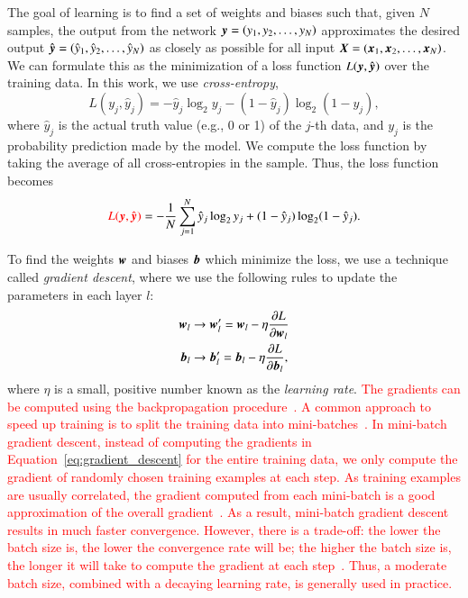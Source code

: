 \documentclass[fleqn,usenatbib]{mnras}
\newcommand{\eg}{{e.g., }}
\newcommand{\changed}[1]{\textcolor{red}{#1}}
\begin{document}
The goal of learning is to find a set of weights and biases such that,
given $N$ samples, the output from the network
$\bmath{y}=\left(y_1, y_2, \dots, y_N \right)$ approximates the desired output
$\hat{\bmath{y}}=\left(\hat{y}_1, \hat{y}_2, \dots, \hat{y}_N \right)$
as closely as possible for all input
$\bmath{X}=\left(\bmath{x}_1,\bmath{x}_2,\dots,\bmath{x}_N\right)$.
We can formulate this as the minimization of a loss function
$L(\bmath{y},\hat{\bmath{y}})$
over the training data.
In this work, we use \textit{cross-entropy},
\begin{equation}
  L(y_j, \hat{y}_j) = -\hat{y}_j \log_2 y_j - (1 - \hat{y}_j) \log_2(1 - y_j),
  \label{eq:cross_entropy}
\end{equation}
where $\hat{y}_j$ is the actual truth value (\eg 0 or 1) of the $j$-th data, and
$y_j$ is the probability prediction made by the model.
We compute the loss function by taking the average of all cross-entropies in the sample.
Thus, the loss function becomes
\begin{equation}
\changed{
  L(\bmath{y}, \hat{\bmath{y}})
}
= - \frac{1}{N} \sum_{j=1}^{N} \hat{y}_j  \log_2 y_j
    + (1 - \hat{y}_j)  \log_2 (1 - \hat y_j).
  \label{eq:cross_entropy_all}
\end{equation}

To find the weights $\bmath{w}$ and biases $\bmath{b}$ which minimize the loss,
we use a technique called \textit{gradient descent},
where we use the following rules to update the parameters in each layer $l$:
\begin{align}
  \bmath{w}_l &\rightarrow
  \bmath{w}_l^{\prime}
  = \bmath{w}_l - \eta \frac{\partial L}{\partial \bmath{w}_l} \nonumber \\
  \bmath{b}_l &\rightarrow
  \bmath{b}_l^{\prime}
  = \bmath{b}_l - \eta \frac{\partial L}{\partial \bmath{b}_l},
  \label{eq:gradient_descent}
\end{align}
where $\eta$ is a small, positive number known as the \textit{learning rate}.
\changed{
The gradients can be computed using the backpropagation
procedure~\citep{rumelhart1988learning}.
A common approach to speed up training is to split the training data
into mini-batches~\citep{lecun1998efficient}.
In mini-batch gradient descent, instead of computing the gradients in
Equation~\ref{eq:gradient_descent} for the entire training data,
we only compute the gradient of randomly chosen training examples at each step.
As training examples are usually correlated,
the gradient computed from each mini-batch is a good approximation
of the overall gradient~\citep{bottou1998online}.
As a result, mini-batch gradient descent results in much faster convergence.
However, there is a trade-off: the lower the batch size is,
the lower the convergence rate will be;
the higher the batch size is, the longer it will take to compute the gradient
at each step~\citep{bousquet2008tradeoffs}.
Thus, a moderate batch size, combined with a decaying learning rate, is
generally used in practice.
}
\end{document}
